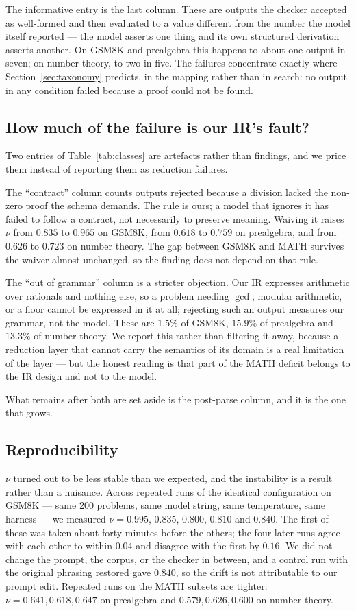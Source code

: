 \documentclass[11pt,a4paper]{article}
\begin{document}
The informative entry is the last column.  These are outputs the checker
accepted as well-formed and then evaluated to a value different from the number
the model itself reported --- the model asserts one thing and its own structured
derivation asserts another.  On GSM8K and prealgebra this happens to about one
output in seven; on number theory, to two in five.  The failures concentrate
exactly where Section~\ref{sec:taxonomy} predicts, in the mapping rather than in
search: no output in any condition failed because a proof could not be found.

\subsection{How much of the failure is our IR's fault?}
\label{sec:protocol-sens}
Two entries of Table~\ref{tab:classes} are artefacts rather than findings, and
we price them instead of reporting them as reduction failures.

The ``contract'' column counts outputs rejected because a division lacked the
non-zero proof the schema demands.  The rule is ours; a model that ignores it has
failed to follow a contract, not necessarily to preserve meaning.  Waiving it
raises $\nu$ from $0.835$ to $0.965$ on GSM8K, from $0.618$ to $0.759$ on
prealgebra, and from $0.626$ to $0.723$ on number theory.  The gap between
GSM8K and MATH survives the waiver almost unchanged, so the finding does not
depend on that rule.

The ``out of grammar'' column is a stricter objection.  Our IR expresses
arithmetic over rationals and nothing else, so a problem needing $\gcd$, modular
arithmetic, or a floor cannot be expressed in it at all; rejecting such an output
measures our grammar, not the model.  These are $1.5\%$ of GSM8K, $15.9\%$ of
prealgebra and $13.3\%$ of number theory.  We report this rather than filtering
it away, because a reduction layer that cannot carry the semantics of its domain
is a real limitation of the layer --- but the honest reading is that part of the
MATH deficit belongs to the IR design and not to the model.

What remains after both are set aside is the post-parse column, and it is the one
that grows.

\subsection{Reproducibility}
\label{sec:protocol-repro}
$\nu$ turned out to be less stable than we expected, and the instability is a
result rather than a nuisance.  Across repeated runs of the identical
configuration on GSM8K --- same 200 problems, same model string, same
temperature, same harness --- we measured $\nu = 0.995$, $0.835$, $0.800$,
$0.810$ and $0.840$.  The first of these was taken about forty minutes before the
others; the four later runs agree with each other to within $0.04$ and disagree
with the first by $0.16$.  We did not change the prompt, the corpus, or the
checker in between, and a control run with the original phrasing restored gave
$0.840$, so the drift is not attributable to our prompt edit.  Repeated runs on
the MATH subsets are tighter: $\nu = 0.641, 0.618, 0.647$ on prealgebra and
$0.579, 0.626, 0.600$ on number theory.
\end{document}
